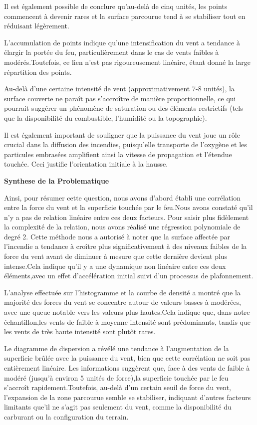 \documentclass[
]{article}
\begin{document}
Il est également possible de conclure qu'au-delà de cinq unités, les
points commencent à devenir rares et la surface parcourue tend à se
stabiliser tout en réduisant légèrement.

L'accumulation de points indique qu'une intensification du vent a
tendance à élargir la portée du feu, particulièrement dans le cas de
vents faibles à modérés.Toutefois, ce lien n'est pas rigoureusement
linéaire, étant donné la large répartition des points.

Au-delà d'une certaine intensité de vent (approximativement 7-8 unités),
la surface couverte ne paraît pas s'accroître de manière
proportionnelle, ce qui pourrait suggérer un phénomène de saturation ou
des éléments restrictifs (tels que la disponibilité du combustible,
l'humidité ou la topographie).

Il est également important de souligner que la puissance du vent joue un
rôle crucial dans la diffusion des incendies, puisqu'elle transporte de
l'oxygène et les particules embrasées amplifient ainsi la vitesse de
propagation et l'étendue touchée. Ceci justifie l'orientation initiale à
la hausse.

\textbf{Synthese de la Problematique}

Ainsi, pour résumer cette question, nous avons d'abord établi une
corrélation entre la force du vent et la superficie touchée par le
feu.Nous avons constaté qu'il n'y a pas de relation linéaire entre ces
deux facteurs. Pour saisir plus fidèlement la complexité de la relation,
nous avons réalisé une régression polynomiale de degré 2. Cette méthode
nous a autorisé à noter que la surface affectée par l'incendie a
tendance à croître plus significativement à des niveaux faibles de la
force du vent avant de diminuer à mesure que cette dernière devient plus
intense.Cela indique qu'il y a une dynamique non linéaire entre ces deux
éléments,avec un effet d'accélération initial suivi d'un processus de
plafonnement.

L'analyse effectuée sur l'histogramme et la courbe de densité a montré
que la majorité des forces du vent se concentre autour de valeurs basses
à modérées, avec une queue notable vers les valeurs plus hautes.Cela
indique que, dans notre échantillon,les vents de faible à moyenne
intensité sont prédominants, tandis que les vents de très haute
intensité sont plutôt rares.

Le diagramme de dispersion a révélé une tendance à l'augmentation de la
superficie brûlée avec la puissance du vent, bien que cette corrélation
ne soit pas entièrement linéaire. Les informations suggèrent que, face à
des vents de faible à modéré (jusqu'à environ 5 unités de force),la
superficie touchée par le feu s'accroît rapidement.Toutefois, au-delà
d'un certain seuil de force du vent, l'expansion de la zone parcourue
semble se stabiliser, indiquant d'autres facteurs limitants que'il ne
s'agit pas seulement du vent, comme la disponibilité du carburant ou la
configuration du terrain.
\end{document}
